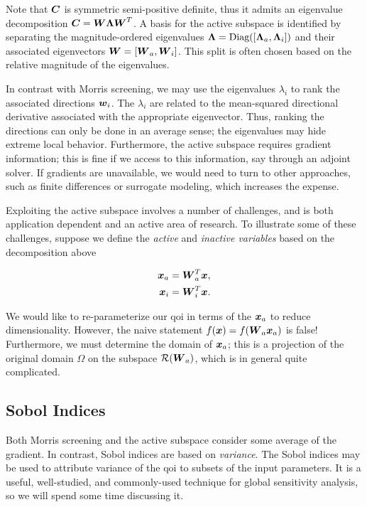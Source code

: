 \documentclass[../primer.tex]{subfiles}
\begin{document}
\noindent Note that \(\boldsymbol{C}\) is symmetric semi-positive definite, thus it admits an
eigenvalue decomposition \(\boldsymbol{C}=\boldsymbol{W}\boldsymbol{\Lambda}\boldsymbol{W}^T\). A basis for the active
subspace is identified by separating the magnitude-ordered eigenvalues
\(\boldsymbol{\Lambda}=\text{Diag}([\boldsymbol{\Lambda}_a,\boldsymbol{\Lambda}_i])\) and their associated
eigenvectors \(\boldsymbol{W}=[\boldsymbol{W}_a,\boldsymbol{W}_i]\). This split is often chosen based on the
relative magnitude of the eigenvalues.

In contrast with Morris screening, we may use the eigenvalues \(\lambda_i\) to
rank the associated directions \(\boldsymbol{w}_i\). The \(\lambda_i\) are related to the
mean-squared directional derivative associated with the appropriate eigenvector.
Thus, ranking the directions can only be done in an average sense; the
eigenvalues may hide extreme local behavior. Furthermore, the active subspace
requires gradient information; this is fine if we access to this information,
say through an adjoint solver. If gradients are unavailable, we would need to
turn to other approaches, such as finite differences or surrogate modeling,
which increases the expense.

Exploiting the active subspace involves a number of challenges, and is both
application dependent and an active area of research. To illustrate some of
these challenges, suppose we define the \emph{active} and \emph{inactive variables} based
on the decomposition above

\begin{equation}\begin{aligned}
  \boldsymbol{x}_a &= \boldsymbol{W}^T_a\boldsymbol{x}, \\
  \boldsymbol{x}_i &= \boldsymbol{W}^T_i\boldsymbol{x}.
\end{aligned}\end{equation}

\noindent We would like to re-parameterize our qoi in terms of the \(\boldsymbol{x}_a\) to
reduce dimensionality. However, the naive statement \(f(\boldsymbol{x})=f(\boldsymbol{W}_a\boldsymbol{x}_a)\) is
false! Furthermore, we must determine the domain of \(\boldsymbol{x}_a\); this is a
projection of the original domain \(\Omega\) on the subspace \(\mathcal{R}(\boldsymbol{W}_a)\), which
is in general quite complicated.

\subsection{Sobol Indices}
\label{sec:orgd776a4d}
Both Morris screening and the active subspace consider some average of the
gradient. In contrast, Sobol indices are based on \emph{variance}. The Sobol indices
may be used to attribute variance of the qoi to subsets of the input parameters.
It is a useful, well-studied, and commonly-used technique for global sensitivity
analysis, so we will spend some time discussing it.
\end{document}
